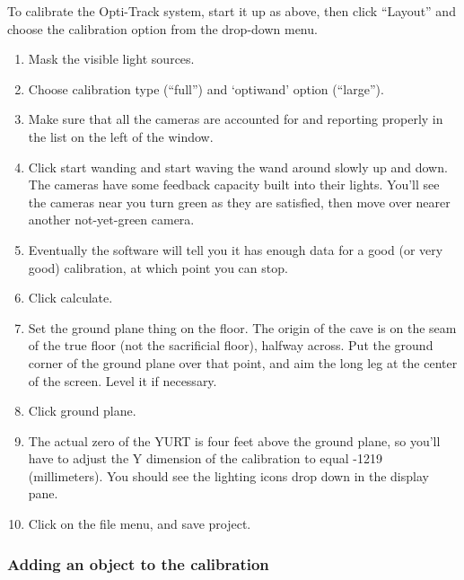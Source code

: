 \documentclass[11pt]{article}
\newcommand{\yurt}{YURT\xspace}
\newcommand{\menu}[1]{``#1''\xspace}
\newcommand{\button}[1]{\textsf{#1}\xspace}
\begin{document}
To calibrate the Opti-Track system, start it up as above, then click
\menu{Layout} and choose the calibration option from the drop-down menu.

\begin{enumerate}

\item Mask the visible light sources.

\item Choose calibration type (``full'') and `optiwand' option
  (``large''). 

\item Make sure that all the cameras are accounted for and reporting
  properly in the list on the left of the window.

\item Click \button{start wanding} and start waving the wand around slowly
  up and down.  The cameras have some feedback capacity built into
  their lights.  You'll see the cameras near you turn green as they
  are satisfied, then move over nearer another not-yet-green camera.

\item Eventually the software will tell you it has enough data for a
  good (or very good) calibration, at which point you can stop.

\item Click \button{calculate}.

\item Set the ground plane thing on the floor.  The origin of the cave is on
  the seam of the true floor (not the sacrificial floor), halfway
  across.  Put the ground corner of the ground plane over that point,
  and aim the long leg at the center of the screen.  Level it if
  necessary.

\item Click \button{ground plane}.

\item The actual zero of the \yurt is four feet above the ground plane,
  so you'll have to adjust the Y dimension of the calibration to equal
  -1219 (millimeters).  You should see the lighting icons drop down in
  the display pane.

\item Click on the file menu, and save project.

\end{enumerate}


\subsubsection{Adding an object to the calibration}
\end{document}
